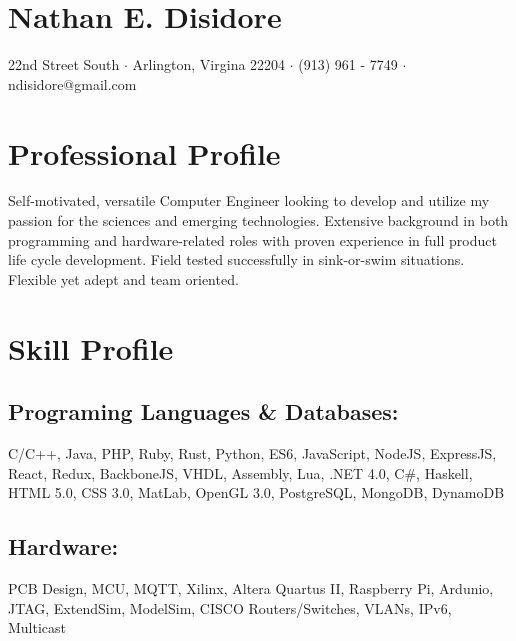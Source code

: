 \documentclass[10pt]{article}
\newcommand{\startsquarepar}{\par\begingroup \parfillskip 0pt \relax}
\newcommand{\stopsquarepar}{\par\endgroup}
\begin{document}
\pagestyle{empty} %

\section*{\Huge Nathan E. Disidore}
\startsquarepar
  3429 22nd Street South $\cdot$ Arlington, Virgina 22204 $\cdot$ (913) 961 - 7749 $\cdot$ ndisidore@gmail.com
\stopsquarepar

\section*{Professional Profile}
Self-motivated, versatile Computer Engineer looking to develop and utilize my passion for the sciences and emerging technologies. Extensive background in both programming and hardware-related roles with proven experience in full product life cycle development. Field tested successfully in sink-or-swim situations. Flexible yet adept and team oriented.

\section*{Skill Profile}
\subsection*{Programing Languages \& Databases:}
C/C++, Java, PHP, Ruby, Rust, Python, ES6, JavaScript, NodeJS, ExpressJS, React, Redux, BackboneJS, VHDL, Assembly, Lua, .NET 4.0, C\#, Haskell, HTML 5.0, CSS 3.0, MatLab, OpenGL 3.0, PostgreSQL, MongoDB, DynamoDB
\subsection*{Hardware:}
PCB Design, MCU, MQTT, Xilinx, Altera Quartus II, Raspberry Pi, Ardunio, JTAG, ExtendSim, ModelSim, CISCO Routers/Switches, VLANs, IPv6, Multicast
\end{document}
